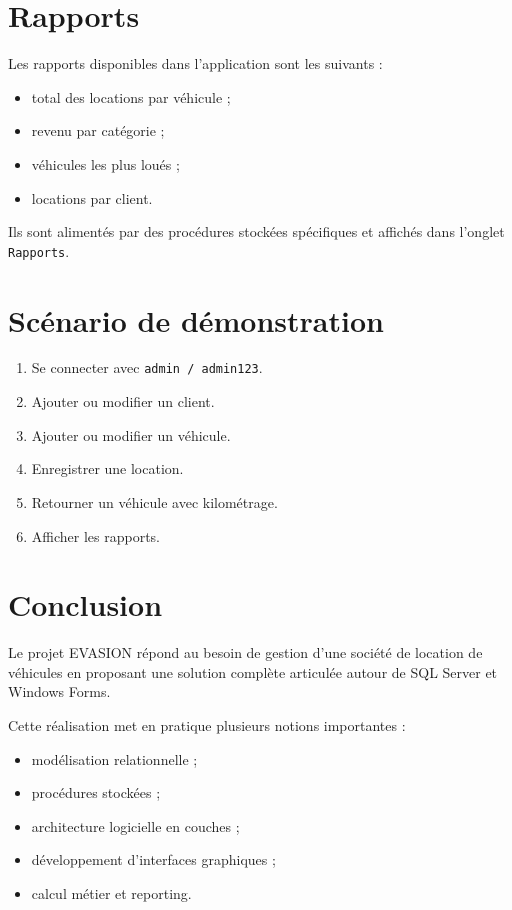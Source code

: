 \documentclass[12pt,a4paper]{report}
\begin{document}
\chapter{Rapports}
Les rapports disponibles dans l'application sont les suivants :
\begin{itemize}[leftmargin=1.2cm]
    \item total des locations par véhicule ;
    \item revenu par catégorie ;
    \item véhicules les plus loués ;
    \item locations par client.
\end{itemize}

Ils sont alimentés par des procédures stockées spécifiques et affichés dans l'onglet \texttt{Rapports}.

\chapter{Scénario de démonstration}
\begin{enumerate}[leftmargin=1.2cm]
    \item Se connecter avec \texttt{admin / admin123}.
    \item Ajouter ou modifier un client.
    \item Ajouter ou modifier un véhicule.
    \item Enregistrer une location.
    \item Retourner un véhicule avec kilométrage.
    \item Afficher les rapports.
\end{enumerate}

\chapter{Conclusion}
Le projet EVASION répond au besoin de gestion d'une société de location de véhicules en proposant une solution complète articulée autour de SQL Server et Windows Forms.

Cette réalisation met en pratique plusieurs notions importantes :
\begin{itemize}[leftmargin=1.2cm]
    \item modélisation relationnelle ;
    \item procédures stockées ;
    \item architecture logicielle en couches ;
    \item développement d'interfaces graphiques ;
    \item calcul métier et reporting.
\end{itemize}
\end{document}
